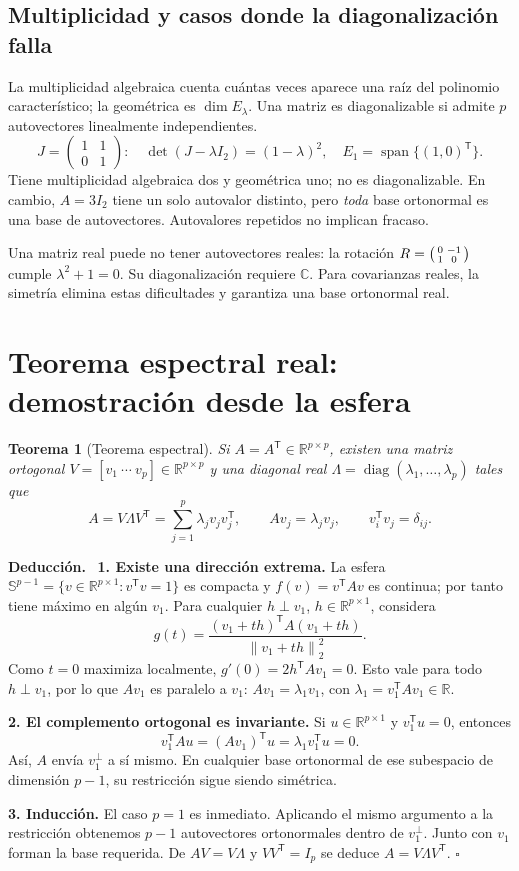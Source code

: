 \documentclass[11pt,a4paper]{article}
\newcommand{\R}{\mathbb R}
\newcommand{\T}{^{\mathsf T}}
\newcommand{\norm}[1]{\left\lVert #1\right\rVert}
\DeclareMathOperator{\spanop}{span}
\newenvironment{deduccion}{\par\textbf{Deducción.}\ }{\hfill$\square$\par}
\DeclareMathOperator{\diag}{diag}
\newcommand{\Sph}{\mathbb S}
\newtheorem{teorema}{Teorema}[section]
\theoremstyle{definition}
\begin{document}
\subsection{Multiplicidad y casos donde la diagonalización falla}
La multiplicidad algebraica cuenta cuántas veces aparece una raíz del polinomio característico; la geométrica es $\dim E_\lambda$. Una matriz es diagonalizable si admite $p$ autovectores linealmente independientes.
\[
J=\begin{pmatrix}1&1\\0&1\end{pmatrix}:\quad
\det(J-\lambda I_2)=(1-\lambda)^2,\quad E_1=\spanop\{(1,0)\T\}.
\]
Tiene multiplicidad algebraica dos y geométrica uno; no es diagonalizable. En cambio, $A=3I_2$ tiene un solo autovalor distinto, pero \emph{toda} base ortonormal es una base de autovectores. Autovalores repetidos no implican fracaso.
\begin{cuidado}
Una matriz real puede no tener autovectores reales: la rotación $R=\begin{psmallmatrix}0&-1\\1&0\end{psmallmatrix}$ cumple $\lambda^2+1=0$. Su diagonalización requiere $\mathbb C$. Para covarianzas reales, la simetría elimina estas dificultades y garantiza una base ortonormal real.
\end{cuidado}

\section{Teorema espectral real: demostración desde la esfera}
\begin{teorema}[Teorema espectral]
Si $A=A\T\in\R^{p\times p}$, existen una matriz ortogonal $V=[v_1\ \cdots\ v_p]\in\R^{p\times p}$ y una diagonal real $\Lambda=\diag(\lambda_1,\ldots,\lambda_p)$ tales que
\[
\boxed{A=V\Lambda V\T=\sum_{j=1}^p\lambda_jv_jv_j\T},\qquad
Av_j=\lambda_jv_j,\qquad v_i\T v_j=\delta_{ij}.
\]
\end{teorema}
\begin{deduccion}
\textbf{1. Existe una dirección extrema.} La esfera $\Sph^{p-1}=\{v\in\R^{p\times1}:v\T v=1\}$ es compacta y $f(v)=v\T Av$ es continua; por tanto tiene máximo en algún $v_1$. Para cualquier $h\perp v_1$, $h\in\R^{p\times1}$, considera
\[
g(t)=\frac{(v_1+th)\T A(v_1+th)}{\norm{v_1+th}_2^2}.
\]
Como $t=0$ maximiza localmente, $g'(0)=2h\T Av_1=0$. Esto vale para todo $h\perp v_1$, por lo que $Av_1$ es paralelo a $v_1$: $Av_1=\lambda_1v_1$, con $\lambda_1=v_1\T Av_1\in\R$.

\textbf{2. El complemento ortogonal es invariante.} Si $u\in\R^{p\times1}$ y $v_1\T u=0$, entonces
\[
v_1\T Au=(Av_1)\T u=\lambda_1v_1\T u=0.
\]
Así, $A$ envía $v_1^\perp$ a sí mismo. En cualquier base ortonormal de ese subespacio de dimensión $p-1$, su restricción sigue siendo simétrica.

\textbf{3. Inducción.} El caso $p=1$ es inmediato. Aplicando el mismo argumento a la restricción obtenemos $p-1$ autovectores ortonormales dentro de $v_1^\perp$. Junto con $v_1$ forman la base requerida. De $AV=V\Lambda$ y $VV\T=I_p$ se deduce $A=V\Lambda V\T$.
\end{deduccion}
\end{document}
